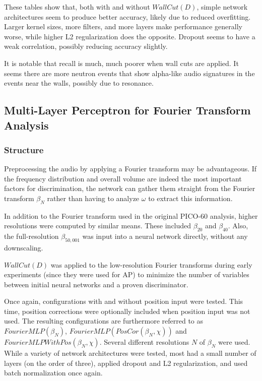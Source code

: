 \documentclass[10pt]{article}
\begin{document}
These tables show that, both with and without $WallCut(D)$, simple network architectures seem to produce better accuracy, likely due to reduced overfitting. Larger kernel sizes, more filters, and more layers make performance generally worse, while higher L2 regularization does the opposite. Dropout seems to have a weak correlation, possibly reducing accuracy slightly.

It is notable that recall is much, much poorer when wall cuts are applied. It seems there are more neutron events that show alpha-like audio signatures in the events near the walls, possibly due to resonance.

\subsection{Multi-Layer Perceptron for Fourier Transform Analysis}

\subsubsection{Structure}

Preprocessing the audio by applying a Fourier transform may be advantageous. If the frequency distribution and overall volume are indeed the most important factors for discrimination, the network can gather them straight from the Fourier transform $\beta_{N}$ rather than having to analyze $\omega$ to extract this information.

In addition to the Fourier transform used in the original PICO-60 analysis, higher resolutions were computed by similar means. These included $\beta _{20}$ and $\beta _{40}$. Also, the full-resolution $\beta _{50,001}$ was input into a neural network directly, without any downscaling.

$WallCut(D)$ was applied to the low-resolution Fourier transforms during early experiments (since they were used for AP) to minimize the number of variables between initial neural networks and a proven discriminator.

Once again, configurations with and without position input were tested. This time, position corrections were optionally included when position input was not used. The resulting configurations are furthermore referred to as $FourierMLP(\beta_{N})$, $FourierMLP(PosCor(\beta_{N}, \chi))$ and $FourierMLPWithPos(\beta_{N}, \chi)$. Several different resolutions $N$ of $\beta_{N}$ were used. While a variety of network architectures were tested, most had a small number of layers (on the order of three), applied dropout and L2 regularization, and used batch normalization once again.
\end{document}
